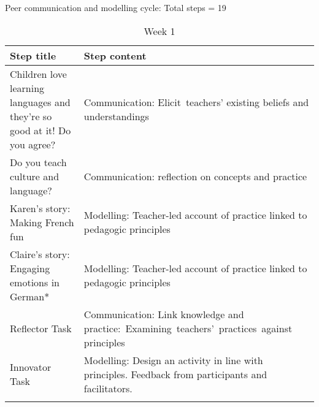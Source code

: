 \documentclass[output=paper]{langscibook}
\begin{document}
\vfill
\begin{table}[H]
\caption{Peer communication and modelling cycle: Total steps = 19}
\label{tab:porter:4}
\begin{subtable}{\textwidth}
\caption{Week 1}
\label{tab:porter:4a}
\begin{tabularx}{\textwidth}{QQ}
\lsptoprule
{Step title} & {Step content}\\
\midrule
 Children love learning languages and they're so good at it! Do you agree? &  Communication: Elicit~teachers’ existing beliefs and understandings~\\
 \tablevspace
 Do you teach culture and language? & Communication: reflection on concepts and practice\\
 \tablevspace
 Karen’s story: Making French fun &  Modelling: Teacher-led account of practice linked to pedagogic principles~\\
\tablevspace
 Claire’s story: Engaging emotions in German* &  Modelling: Teacher-led account of practice linked to pedagogic principles~\\
 \tablevspace
 Reflector Task & Communication: Link knowledge and practice:~Examining~teachers’~practices~against principles~\\
 \tablevspace
 Innovator Task & Modelling: Design an activity in line with principles. Feedback from participants and facilitators. \\
\lspbottomrule
\end{tabularx}
\end{subtable}
\end{table}
\vfill\pagebreak
\end{document}
